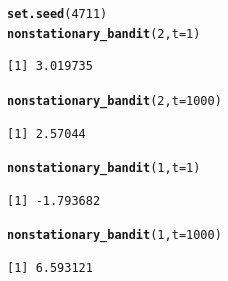 \documentclass[10pt, a4paper, english]{article}\usepackage[]{graphicx}\usepackage[dvipsnames]{xcolor}
\makeatletter
\newcommand{\hlnum}[1]{\textcolor[rgb]{0.686,0.059,0.569}{#1}}%
\newcommand{\hlstd}[1]{\textcolor[rgb]{0.345,0.345,0.345}{#1}}%
\newcommand{\hlkwc}[1]{\textcolor[rgb]{0.333,0.667,0.333}{#1}}%
\newcommand{\hlkwd}[1]{\textcolor[rgb]{0.737,0.353,0.396}{\textbf{#1}}}%
\newenvironment{kframe}{%
 \def\at@end@of@kframe{}%
 \ifinner\ifhmode%
  \def\at@end@of@kframe{\end{minipage}}%
  \begin{minipage}{\columnwidth}%
 \fi\fi%
 \def\FrameCommand##1{\hskip\@totalleftmargin \hskip-\fboxsep
 \colorbox{shadecolor}{##1}\hskip-\fboxsep
     \hskip-\linewidth \hskip-\@totalleftmargin \hskip\columnwidth}%
 \MakeFramed {\advance\hsize-\width
   \@totalleftmargin\z@ \linewidth\hsize
   \@setminipage}}%
 {\par\unskip\endMakeFramed%
 \at@end@of@kframe}
\newenvironment{knitrout}{}{} %
\makeatother
\begin{document}
\begin{knitrout}
\color{fgcolor}\begin{kframe}
\begin{alltt}
\hlkwd{set.seed}\hlstd{(}\hlnum{4711}\hlstd{)}
\hlkwd{nonstationary_bandit}\hlstd{(}\hlnum{2}\hlstd{,} \hlkwc{t} \hlstd{=} \hlnum{1}\hlstd{)}
\end{alltt}
\begin{verbatim}
[1] 3.019735
\end{verbatim}
\begin{alltt}
\hlkwd{nonstationary_bandit}\hlstd{(}\hlnum{2}\hlstd{,} \hlkwc{t} \hlstd{=} \hlnum{1000}\hlstd{)}
\end{alltt}
\begin{verbatim}
[1] 2.57044
\end{verbatim}
\begin{alltt}
\hlkwd{nonstationary_bandit}\hlstd{(}\hlnum{1}\hlstd{,} \hlkwc{t} \hlstd{=} \hlnum{1}\hlstd{)}
\end{alltt}
\begin{verbatim}
[1] -1.793682
\end{verbatim}
\begin{alltt}
\hlkwd{nonstationary_bandit}\hlstd{(}\hlnum{1}\hlstd{,} \hlkwc{t} \hlstd{=} \hlnum{1000}\hlstd{)}
\end{alltt}
\begin{verbatim}
[1] 6.593121
\end{verbatim}
\end{kframe}
\end{knitrout}
 
\end{document}
